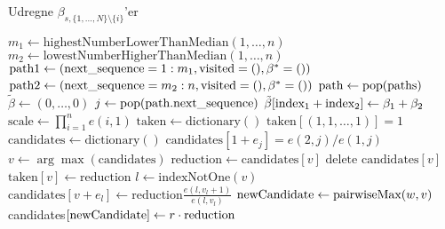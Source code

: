 \documentclass[a4paper, 12pt]{article}
\begin{document}
\begin{algorithm}
\caption{Udregne $\beta_{s,\{1, \dots, N\}\setminus \{i\}}$'er}\label{compute_betas}
\begin{algorithmic}[1]
\State $m_1 \gets \text{highestNumberLowerThanMedian}(1, \dots, n)$
\State $m_2 \gets \text{lowestNumberHigherThanMedian}(1, \dots, n)$
\State $\text{path1} \gets (\text{next\_sequence}=1:m_1, \textup{visited}=(), \beta^*=())$
\State $\text{path2} \gets (\text{next\_sequence}=m_2:n, \textup{visited}=(), \beta^*=())$
\State $\text{path}\gets \textup{pop}(\textup{paths})$
\State $\tilde \beta \gets (0, \dots, 0)$
\State $j \gets \textup{pop}(\textup{path}.\textup{next\_sequence})$ 
\State $\tilde  \beta[\textup{index}_1+\textup{index}_2] \gets \beta_1+\beta_2$
\EndFor
\EndFor
\EndWhile
\State $\text{scale} \gets \prod_{i=1}^n e(i,1)$
\State $\text{taken} \gets \text{dictionary}()$
\State $\text{taken}[(1,1, \dots, 1)]=1$
\State $\text{candidates} \gets \text{dictionary}()$
\State $\text{candidates}[1+e_j]=e(2,j)/e(1,j)$
\EndFor
{}
\State $v\gets \arg \max( \text{candidates})$
\State $\text{reduction} \gets \text{candidates}[v]$
\State $\text{delete candidates}[v]$
\State $\text{taken}[v] \gets \text{reduction}$
\State $l\gets \text{indexNotOne}(v)$
\State $\text{candidates}[v+e_l]\gets \text{reduction}\frac{e(l,v_l+1)}{e(l,v_l)}$
\EndIf
{}
\State $\textup{newCandidate}\gets \textup{pairwiseMax}(w,v)$
\State candidates$[\textup{newCandidate}] \gets r\cdot\text{reduction} $
\EndIf
\EndFor
\EndWhile
\State {}
\EndProcedure
\end{algorithmic}
\end{algorithm}
\end{document}

